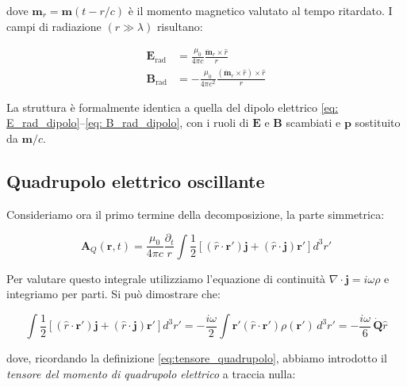 dove $\mathbf{m}_r = \mathbf{m}(t - r/c)$ è il momento magnetico valutato al tempo ritardato. I campi di radiazione $(r \gg \lambda)$ risultano:

\begin{tcolorbox}[colback=yellow!10!white, colframe=orange!70!black, boxrule=0.8pt]
\begin{align}
    \mathbf{E}_{\text{rad}} &= \frac{\mu_0}{4\pi c} \frac{\ddot{\mathbf{m}}_r \times \hat{r}}{r} \label{eq: campo_elettrico_dip_magnetico}\\[6pt]
    \mathbf{B}_{\text{rad}} &= -\frac{\mu_0}{4\pi c^2} \frac{(\ddot{\mathbf{m}}_r \times \hat{r}) \label{eq: campo_magnetico_dip_magnetico} \times \hat{r}}{r}
\end{align}
\end{tcolorbox}

La struttura è formalmente identica a quella del dipolo elettrico \eqref{eq: E_rad_dipolo}--\eqref{eq: B_rad_dipolo}, con i ruoli di $\mathbf{E}$ e $\mathbf{B}$ scambiati e $\mathbf{p}$ sostituito da $\mathbf{m}/c$. 

\subsection{Quadrupolo elettrico oscillante}

Consideriamo ora il primo termine della decomposizione, la parte simmetrica:

\begin{equation}
    \mathbf{A}_{Q}(\mathbf{r}, t) = \frac{\mu_0}{4\pi c} \frac{\partial_t}{r} \int \frac{1}{2} \left[(\hat{r} \cdot \mathbf{r'}) \mathbf{j} + (\hat{r} \cdot \mathbf{j}) \mathbf{r'}\right] d^3r'
\end{equation}

Per valutare questo integrale utilizziamo l'equazione di continuità $\nabla \cdot \mathbf{j} = i\omega\rho$ e integriamo per parti. 
Si può dimostrare che:

\begin{equation}
    \int \frac{1}{2}\left[(\hat{r} \cdot \mathbf{r'}) \mathbf{j} + (\hat{r} \cdot \mathbf{j}) \mathbf{r'}\right] d^3r' = -\frac{i\omega}{2} \int \mathbf{r'}(\hat{r} \cdot \mathbf{r'}) \rho(\mathbf{r'}) \, d^3r' = -\frac{i\omega}{6} \, \dot{\mathbf{Q}}\hat{r}
\end{equation}

dove, ricordando la definizione \eqref{eq:tensore_quadrupolo}, abbiamo introdotto il \emph{tensore del momento di quadrupolo 
elettrico} a traccia nulla: 

